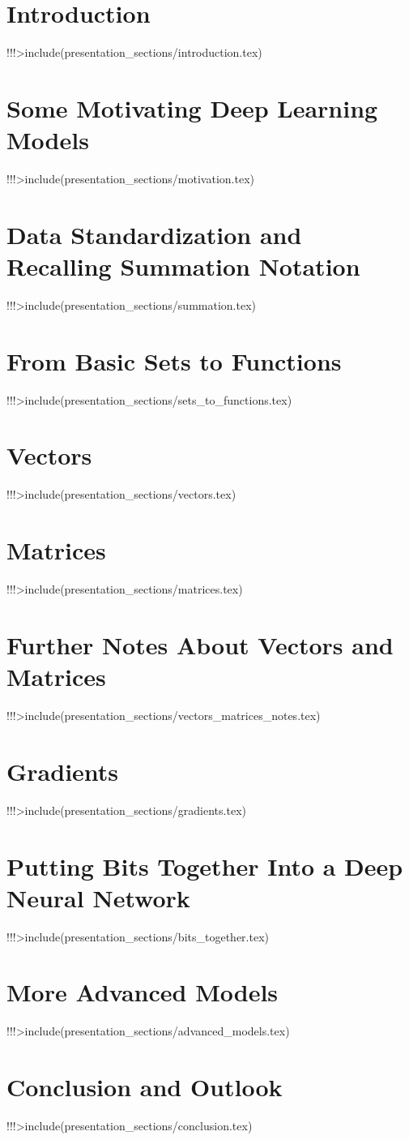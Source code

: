 \section{Introduction}
!!!>include(presentation_sections/introduction.tex)

\section{Some Motivating Deep Learning Models}
!!!>include(presentation_sections/motivation.tex)

\section{Data Standardization and Recalling Summation Notation}
!!!>include(presentation_sections/summation.tex)

\section{From Basic Sets to Functions}
!!!>include(presentation_sections/sets_to_functions.tex)

\section{Vectors}
!!!>include(presentation_sections/vectors.tex)

\section{Matrices}
!!!>include(presentation_sections/matrices.tex)

\section{Further Notes About Vectors and Matrices}
!!!>include(presentation_sections/vectors_matrices_notes.tex)

\section{Gradients}
!!!>include(presentation_sections/gradients.tex)

\section{Putting Bits Together Into a Deep Neural Network}
!!!>include(presentation_sections/bits_together.tex)

\section{More Advanced Models}
!!!>include(presentation_sections/advanced_models.tex)

\section{Conclusion and Outlook}
!!!>include(presentation_sections/conclusion.tex)
